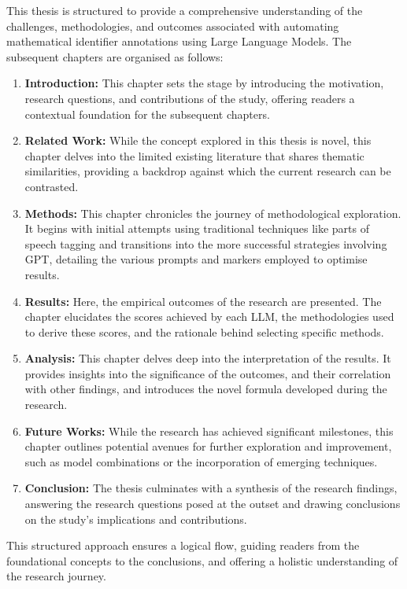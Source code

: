 This thesis is structured to provide a comprehensive understanding of the challenges, methodologies, and outcomes associated with automating mathematical identifier annotations using Large Language Models. The subsequent chapters are organised as follows:

\begin{enumerate}
    \item \textbf{Introduction:} This chapter sets the stage by introducing the motivation, research questions, and contributions of the study, offering readers a contextual foundation for the subsequent chapters.
    
    \item \textbf{Related Work:} While the concept explored in this thesis is novel, this chapter delves into the limited existing literature that shares thematic similarities, providing a backdrop against which the current research can be contrasted.
    
    \item \textbf{Methods:} This chapter chronicles the journey of methodological exploration. It begins with initial attempts using traditional techniques like parts of speech tagging and transitions into the more successful strategies involving GPT, detailing the various prompts and markers employed to optimise results.
    
    \item \textbf{Results:} Here, the empirical outcomes of the research are presented. The chapter elucidates the scores achieved by each LLM, the methodologies used to derive these scores, and the rationale behind selecting specific methods.
    
    \item \textbf{Analysis:} This chapter delves deep into the interpretation of the results. It provides insights into the significance of the outcomes, and their correlation with other findings, and introduces the novel formula developed during the research.
    
    \item \textbf{Future Works:} While the research has achieved significant milestones, this chapter outlines potential avenues for further exploration and improvement, such as model combinations or the incorporation of emerging techniques.
    
    \item \textbf{Conclusion:} The thesis culminates with a synthesis of the research findings, answering the research questions posed at the outset and drawing conclusions on the study's implications and contributions.
\end{enumerate}

This structured approach ensures a logical flow, guiding readers from the foundational concepts to the conclusions, and offering a holistic understanding of the research journey.

